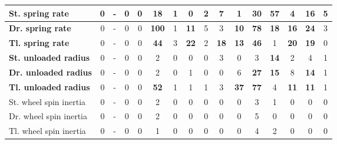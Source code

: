 \begin{table}[H]
\begin{tabular}{|l|c|c|c|c|c|c|c|c|c|c|c|c|c|c|c|}
\hline
\textcolor[rgb]{0.000, 0.447, 0.698}{\textbf{St. spring rate}} & 0 & - & 0 & 0 & \textbf{18} & 1 & 0 & 2 & 7 & 1 & \textcolor[rgb]{0.000, 0.620, 0.451}{\textbf{30}} & \textcolor[rgb]{0.000, 0.447, 0.698}{\textbf{57}} & 4 & \textbf{16} & 5 \\
\hline
\textcolor[rgb]{0.851, 0.373, 0.008}{\textbf{Dr. spring rate}} & 0 & - & 0 & 0 & \textcolor[rgb]{0.835, 0.369, 0.000}{\textbf{100}} & 1 & \textbf{11} & 5 & 3 & \textbf{10} & \textcolor[rgb]{0.000, 0.447, 0.698}{\textbf{78}} & \textbf{18} & \textbf{16} & \textbf{24} & 3 \\
\hline
\textcolor[rgb]{0.000, 0.620, 0.451}{\textbf{Tl. spring rate}} & 0 & - & 0 & 0 & \textcolor[rgb]{0.000, 0.620, 0.451}{\textbf{44}} & 3 & \textbf{22} & 2 & \textbf{18} & \textbf{13} & \textcolor[rgb]{0.000, 0.620, 0.451}{\textbf{46}} & 1 & \textbf{20} & \textbf{19} & 0 \\
\hline
\textbf{St. unloaded radius} & 0 & - & 0 & 0 & 2 & 0 & 0 & 0 & 3 & 0 & 3 & \textbf{14} & 2 & 4 & 1 \\
\hline
\textcolor[rgb]{0.000, 0.620, 0.451}{\textbf{Dr. unloaded radius}} & 0 & - & 0 & 0 & 2 & 0 & 1 & 0 & 0 & 6 & \textcolor[rgb]{0.000, 0.620, 0.451}{\textbf{27}} & \textbf{15} & 8 & \textbf{14} & 1 \\
\hline
\textcolor[rgb]{0.000, 0.447, 0.698}{\textbf{Tl. unloaded radius}} & 0 & - & 0 & 0 & \textcolor[rgb]{0.000, 0.447, 0.698}{\textbf{52}} & 1 & 1 & 1 & 3 & \textcolor[rgb]{0.000, 0.620, 0.451}{\textbf{37}} & \textcolor[rgb]{0.000, 0.447, 0.698}{\textbf{77}} & 4 & \textbf{11} & \textbf{11} & 1 \\
\hline
St. wheel spin inertia & 0 & - & 0 & 0 & 2 & 0 & 0 & 0 & 0 & 0 & 3 & 1 & 0 & 0 & 0 \\
\hline
Dr. wheel spin inertia & 0 & - & 0 & 0 & 2 & 0 & 0 & 0 & 0 & 0 & 5 & 0 & 0 & 0 & 0 \\
\hline
Tl. wheel spin inertia & 0 & - & 0 & 0 & 1 & 0 & 0 & 0 & 0 & 0 & 4 & 2 & 0 & 0 & 0 \\
\hline

\end{tabular}%
\end{table}%



